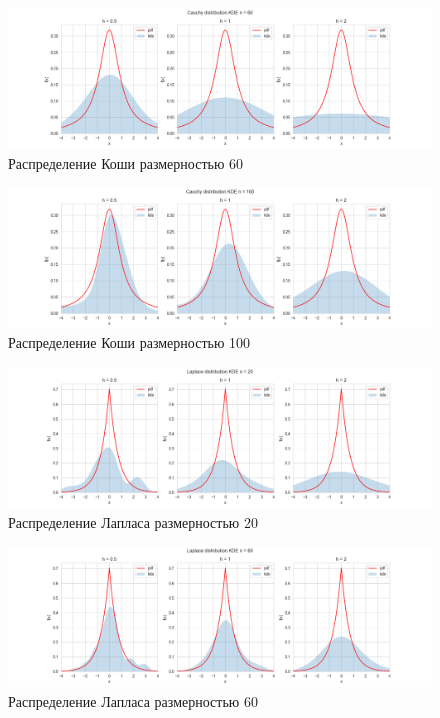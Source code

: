 \documentclass[a4paper,14pt]{article}
\begin{document}
	\begin{figure}[H]
		\centering
		\includegraphics[scale=0.35]{../image/lab4/lab4_kde_cauchy_60.png}
		\caption{Распределение Коши размерностью 60}
	\end{figure}
	
	\begin{figure}[H]
		\centering
		\includegraphics[scale=0.35]{../image/lab4/lab4_kde_cauchy_100.png}
		\caption{Распределение Коши размерностью 100}
	\end{figure}
	
	\begin{figure}[H]
		\centering
		\includegraphics[scale=0.35]{../image/lab4/lab4_kde_laplace_20.png}
		\caption{Распределение Лапласа размерностью 20}
	\end{figure}
	
	\begin{figure}[H]
		\centering
		\includegraphics[scale=0.35]{../image/lab4/lab4_kde_laplace_60.png}
		\caption{Распределение Лапласа размерностью 60}
	\end{figure}
	
\end{document}

